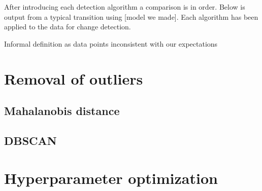 After introducing each detection algorithm a comparison is in order. Below is output from a typical transition using [model we made]. Each algorithm has been applied to the data for change detection.


Informal definition as data points inconsistent with our expectations

\section{Removal of outliers}


\subsection{Mahalanobis distance}

\subsection{DBSCAN}

\section{Hyperparameter optimization}
\fi


